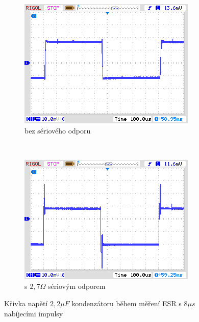 \begin{figure}[H]
  \begin{subfigure}[b]{.5\textwidth}
    \centering
    \includegraphics[width=1.\textwidth]{../PNG/NewEsr2u2F0R0.png}
    \caption{bez sériového odporu}
  \end{subfigure}
  ~
  \begin{subfigure}[b]{.5\textwidth}
    \centering
    \includegraphics[width=1.\textwidth]{../PNG/NewEsr2u2F2R7.png}
    \caption{s \(2,7\Omega\) sériovým odporem}
  \end{subfigure}
  \caption{Křivka napětí \(2,2\mu F\) kondenzátoru během měření ESR s \(8\mu s\) nabíjecími impulsy}
  \label{pic:NewEsr2}
\end{figure}

